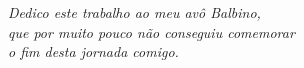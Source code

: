 \begin{dedicatoria}
   \vspace*{\fill}
   \centering
   \noindent

   \textit{Dedico este trabalho ao meu avô Balbino, \\ que por muito pouco não conseguiu comemorar\\ o fim desta jornada comigo.} \vspace*{\fill}
\end{dedicatoria}